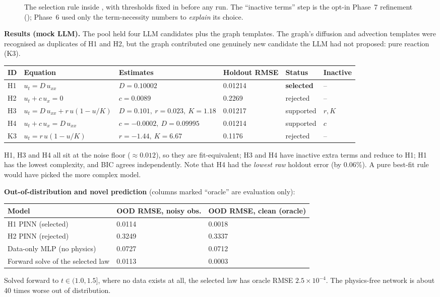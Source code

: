 \begin{figure}[!htb]
\centering

\caption{The selection rule inside , with thresholds fixed in  before any run.
The ``inactive terms'' step is the opt-in Phase~7 refinement (); Phase~6 used only the
term-necessity numbers to \emph{explain} its choice.}
\label{fig:selection}
\end{figure}

\textbf{Results (mock LLM).} The pool held four LLM candidates plus the graph templates. The graph's diffusion and
advection templates were recognised as duplicates of H1 and H2, but the graph contributed one genuinely new
candidate the LLM had not proposed: pure reaction (K3).

\begin{center}
\footnotesize\setlength{\tabcolsep}{4pt}
\begin{tabular}{@{}llllll@{}}
\toprule
\textbf{ID} & \textbf{Equation} & \textbf{Estimates} & \textbf{Holdout RMSE} & \textbf{Status} & \textbf{Inactive} \\ \midrule
H1 & $u_t = D\,u_{xx}$ & $D=0.10002$ & 0.01214 & \textbf{selected} & -- \\
H2 & $u_t + c\,u_x = 0$ & $c=0.0089$ & 0.2269 & rejected & -- \\
H3 & $u_t = D\,u_{xx} + r\,u(1-u/K)$ & $D=0.101,\ r=0.023,\ K=1.18$ & 0.01217 & supported & $r, K$ \\
H4 & $u_t + c\,u_x = D\,u_{xx}$ & $c=-0.0002,\ D=0.09995$ & 0.01214 & supported & $c$ \\
K3 & $u_t = r\,u(1-u/K)$ & $r=-1.44,\ K=6.67$ & 0.1176 & rejected & -- \\
\bottomrule
\end{tabular}
\end{center}

H1, H3 and H4 all sit at the noise floor ($\approx0.012$), so they are fit-equivalent; H3 and H4 have inactive
extra terms and reduce to H1; H1 has the lowest complexity, and BIC agrees independently. Note that H4 had the
\emph{lowest raw} holdout error (by 0.06\%). A pure best-fit rule would have picked the more complex model.

\textbf{Out-of-distribution and novel prediction} (columns marked ``oracle'' are evaluation only):
\begin{center}
\small
\begin{tabular}{@{}lll@{}}
\toprule
\textbf{Model} & \textbf{OOD RMSE, noisy obs.} & \textbf{OOD RMSE, clean (oracle)} \\ \midrule
H1 PINN (selected) & 0.0114 & 0.0018 \\
H2 PINN (rejected) & 0.3249 & 0.3337 \\
Data-only MLP (no physics) & 0.0727 & 0.0712 \\
Forward solve of the selected law & 0.0113 & 0.0003 \\
\bottomrule
\end{tabular}
\end{center}
Solved forward to $t\in(1.0,1.5]$, where no data exists at all, the selected law has oracle RMSE
$2.5\times10^{-4}$. The physics-free network is about 40 times worse out of distribution.

